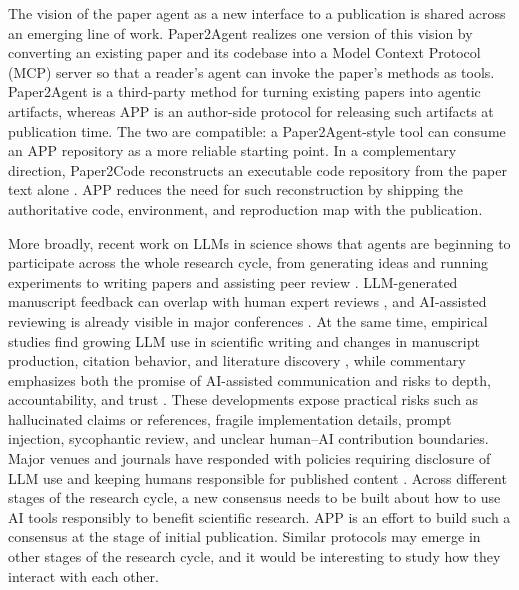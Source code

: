 \documentclass{article}
\begin{document}
The vision of the paper agent as a new interface to a publication \cite{qi2026agentification} is shared across an emerging line of work. Paper2Agent
\cite{miao2025paper2agent} realizes one version of this vision by converting an
existing paper and its codebase into a Model Context Protocol (MCP) server
\cite{anthropic2024mcp} so that a reader's agent can invoke the paper's methods
as tools. Paper2Agent is a third-party method for turning existing papers into
agentic artifacts, whereas APP is an author-side protocol for releasing such
artifacts at publication time. The two are compatible: a Paper2Agent-style tool
can consume an APP repository as a more reliable starting point. In a
complementary direction, Paper2Code reconstructs
an executable code repository from the paper text alone \cite{seo2026paper2code}. 
APP reduces the need for such reconstruction by shipping the authoritative
code, environment, and reproduction map with the publication.

More broadly, recent work on LLMs in science shows that agents are beginning to
participate across the whole research cycle, from generating ideas and running
experiments to writing papers and assisting peer review
\cite{lu2024aiscientist,bianchi2026agents4science}. LLM-generated manuscript
feedback can overlap with human expert reviews \cite{liang2024llmfeedback}, and
AI-assisted reviewing is already visible in major conferences
\cite{latona2024aireviewlottery}. At the same time, empirical studies find
growing LLM use in scientific writing and changes in manuscript production,
citation behavior, and literature discovery
\cite{liang2025usage,kusumegi2025production}, while commentary emphasizes both
the promise of AI-assisted communication and risks to depth, accountability, and
trust \cite{bertolo2024publishing}. These developments expose practical risks
such as hallucinated claims or references, fragile implementation details, prompt
injection, sycophantic review, and unclear human--AI contribution boundaries. Major venues and journals have responded with policies requiring
disclosure of LLM use and keeping humans responsible for published content
\cite{icml2023llmpolicy,nature2023chatgpt,thorp2023chatgpt,neurips2025llmpolicy,iclr2026llmpolicy}. Across different stages of the research cycle, a new consensus needs to be built about how to use AI tools responsibly to benefit scientific research. APP is an effort to build such a consensus at the stage of initial publication. Similar protocols may emerge in other stages of the research cycle, and it would be interesting to study how they interact with each other. 
\end{document}
